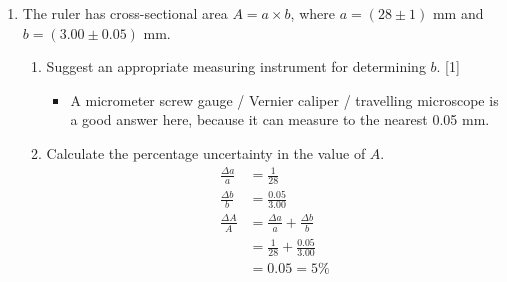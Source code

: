\documentclass[a4paper,12pt]{article}
\begin{document}
\begin{enumerate}[label=(\alph*)]
\begin{itemize}
        \end{itemize}

        \pagebreak
  \item The ruler has cross-sectional area $A = a\times b$, where $a = (28 \pm 1)$ mm and $b = (3.00 \pm 0.05)$ mm.

        \begin{enumerate}
          \item Suggest an appropriate measuring instrument for determining $b$. \hfill [1]
                \begin{itemize}
                  \item A micrometer screw gauge / Vernier caliper / travelling microscope is a good answer here, because it can measure to the nearest 0.05 mm.
                \end{itemize}
          \item Calculate the percentage uncertainty in the value of $A$.
                \begin{align*}
                  \frac{\Delta a}{a} & = \frac{1}{28}                            \\
                  \frac{\Delta b}{b} & = \frac{0.05}{3.00}                       \\
                  \frac{\Delta A}{A} & = \frac{\Delta a}{a} + \frac{\Delta b}{b} \\
                                     & = \frac{1}{28} + \frac{0.05}{3.00}        \\
                                     & = 0.05 = 5\%
                \end{align*}
        \end{enumerate}

\end{enumerate}
\end{document}
